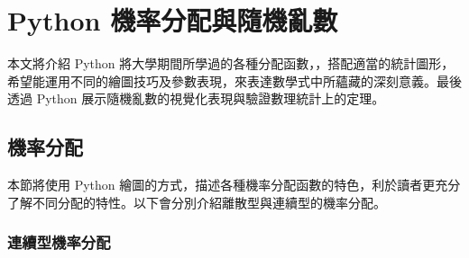 %   
%

\chapter{Python 機率分配與隨機亂數}
本文將介紹 Python 將大學期間所學過的各種分配函數，，搭配適當的統計圖形，希望能運用不同的繪圖技巧及參數表現，來表達數學式中所蘊藏的深刻意義。最後透過 Python 展示隨機亂數的視覺化表現與驗證數理統計上的定理。

\section{機率分配}
本節將使用 Python 繪圖的方式，描述各種機率分配函數的特色，利於讀者更充分了解不同分配的特性。以下會分別介紹離散型與連續型的機率分配。
\subsection{連續型機率分配}

